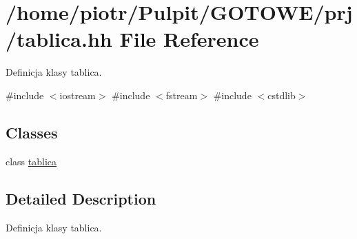 \hypertarget{tablica_8hh}{\section{/home/piotr/\-Pulpit/\-G\-O\-T\-O\-W\-E/prj/tablica.hh \-File \-Reference}
\label{tablica_8hh}
}


\-Definicja klasy tablica.  


{\ttfamily \#include $<$iostream$>$}\*
{\ttfamily \#include $<$fstream$>$}\*
{\ttfamily \#include $<$cstdlib$>$}\*
\subsection*{\-Classes}
\begin{DoxyCompactItemize}
\item 
class \hyperlink{classtablica}{tablica}
\end{DoxyCompactItemize}


\subsection{\-Detailed \-Description}
\-Definicja klasy tablica. 